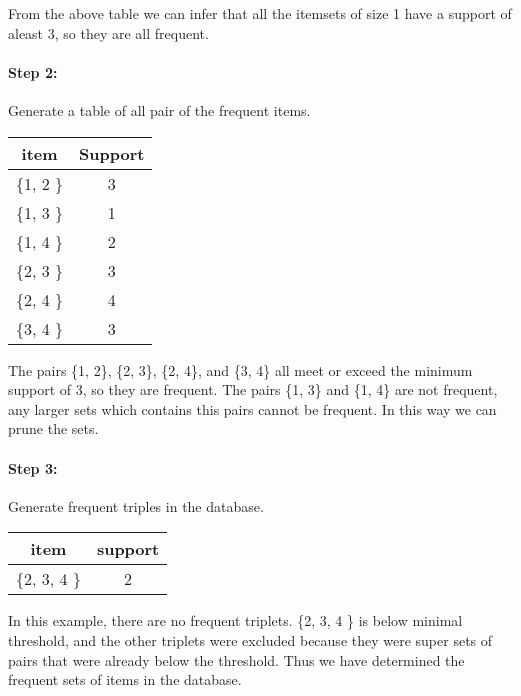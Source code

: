 \documentclass{book}
\begin{document}
From the above table we can infer that all the itemsets of size 1 have a support of aleast 3, so they are all frequent.

\paragraph{Step 2:} Generate a table of all pair of the frequent items.

\begin{center}
    \begin{tabular}{|c|c|}
        \hline
        \textbf{item} & \textbf{Support} \\
        \hline
        \{1, 2 \} & 3 \\
        \{1, 3 \} & 1 \\
        \{1, 4 \} & 2 \\
        \{2, 3 \} & 3 \\
        \{2, 4 \} & 4\\
        \{3, 4 \} & 3 \\
        \hline
    \end{tabular}

    The pairs \{1, 2\}, \{2, 3\}, \{2, 4\}, and \{3, 4\} all meet or exceed the minimum support of 3, so they are frequent. The pairs \{1, 3\} and \{1, 4\} are not frequent, any larger sets which contains this pairs cannot be frequent. In this way we can prune the sets.
\end{center}

\paragraph{Step 3:} Generate frequent triples in the database.

\begin{center}
    \begin{tabular}{|c|c|}
        \hline
        \textbf{item} & \textbf{support} \\
        \hline
        \{2, 3, 4 \} & 2 \\
        \hline
    \end{tabular}
\end{center}

In this example, there are no frequent triplets. \{2, 3, 4 \} is below minimal threshold, and the other triplets were excluded because they were super sets of pairs that were already below the threshold. Thus we have determined the frequent sets of items in the database.
\end{document}
